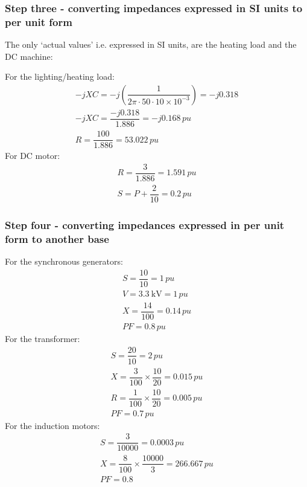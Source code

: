 \subsubsection{Step three - converting impedances expressed in SI units to per unit form}
The only `actual values' i.e. expressed in SI units, are the heating load and the DC machine:

For the lighting/heating load:
\begin{gather}
	-jXC = -j \left( \dfrac{1}{2\pi\cdot 50 \cdot 10 \times 10^{-3}}\right) = -j0.318\\
	-jXC = \dfrac{-j0.318}{1.886} = -j0.168\, \si{pu}\\
	R = \dfrac{100}{1.886} = 53.022\,\si{pu}
\end{gather}
For DC motor:
\begin{gather}
	R = \dfrac{3}{1.886} = 1.591\, \si{pu}\\
	S = P + \dfrac{2}{10} = 0.2\, \si{pu}
\end{gather}
\subsubsection{Step four - converting impedances expressed in per unit form to another base}
For the synchronous generators:
\begin{gather}
	S = \dfrac{10}{10} = 1\, \si{pu}\\
	V = \SI{3.3}{\kilo\volt} = 1\, \si{pu}\\
	X = \dfrac{14}{100} = 0.14\, \si{pu}\\
	PF = 0.8\, \si{pu}
\end{gather}
For the transformer:
\begin{gather}
	S = \dfrac{20}{10} = 2\, \si{pu}\\
	X = \dfrac{3}{100} \times \dfrac{10}{20} = 0.015\,\si{pu}\\
	R = \dfrac{1}{100} \times \dfrac{10}{20} = 0.005\,\si{pu}\\
	PF = 0.7\,\si{pu}
\end{gather}
For the induction motors:
\begin{gather}
	S = \dfrac{3}{10000} = 0.0003\,\si{pu} \\
	X = \dfrac{8}{100} \times \dfrac{10000}{3} = 266.667\,\si{pu} \\
	PF = 0.8
\end{gather}
